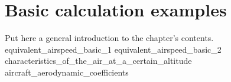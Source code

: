 \documentclass[[12pt,twoside]{book}
\begin{document}
%
%
\chapter%
   [Basic calculation examples]%
   {Basic calculation examples}
\label{chap:Basics}

\setcounter{minitocdepth}{2}%
\minitoc %

\vspace{\baselineskip}

\noindent
Put here a general introduction to the chapter's contents.
% 
{equivalent_airspeed_basic_1}
{equivalent_airspeed_basic_2}
{characteristics_of_the_air_at_a_certain_altitude}
{aircraft_aerodynamic_coefficients}
\end{document}
